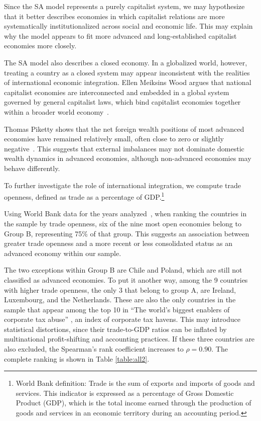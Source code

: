 \documentclass[12pt]{article}
\begin{document}
Since the SA model represents a purely capitalist system, we may hypothesize that it better describes economies in which capitalist relations are more systematically institutionalized across social and economic life. This may explain why the model appears to fit more advanced and long-established capitalist economies more closely.

The SA model also describes a closed economy. In a globalized world, however, treating a country as a closed system may appear inconsistent with the realities of international economic integration. Ellen Meiksins Wood argues that national capitalist economies are interconnected and embedded in a global system governed by general capitalist laws, which bind capitalist economies together within a broader world economy~\cite{wood}.

Thomas Piketty shows that the net foreign wealth positions of most advanced economies have remained relatively small, often close to zero or slightly negative~\cite{piketty}. This suggests that external imbalances may not dominate domestic wealth dynamics in advanced economies, although non-advanced economies may behave differently.

To further investigate the role of international integration, we compute trade openness, defined as trade as a percentage of GDP.\footnote{World Bank definition: Trade is the sum of exports and imports of goods and services. This indicator is expressed as a percentage of Gross Domestic Product (GDP), which is the total income earned through the production of goods and services in an economic territory during an accounting period.} 

Using World Bank data for the years analyzed~\cite{WB}, when ranking the countries in the sample by trade openness, six of the nine most open economies belong to Group B, representing 75\% of that group. This suggests an association between greater trade openness and a more recent or less consolidated status as an advanced economy within our sample.

The two exceptions within Group B are Chile and Poland, which are still not classified as advanced economies. To put it another way, among the 9 countries with higher trade openness, the only 3 that belong to group A,  are Ireland, Luxembourg, and the Netherlands. These are also the only countries in the sample that appear among the top 10 in ``The world's biggest enablers of corporate tax abuse'' \cite{tax}, an index of corporate tax havens. This may introduce statistical distortions, since their trade-to-GDP ratios can be inflated by multinational profit-shifting and accounting practices. If these three countries are also excluded, the Spearman's rank coefficient increases to $\rho=0.90$.  The complete ranking is shown in Table \ref{table:all2}.
\end{document}
